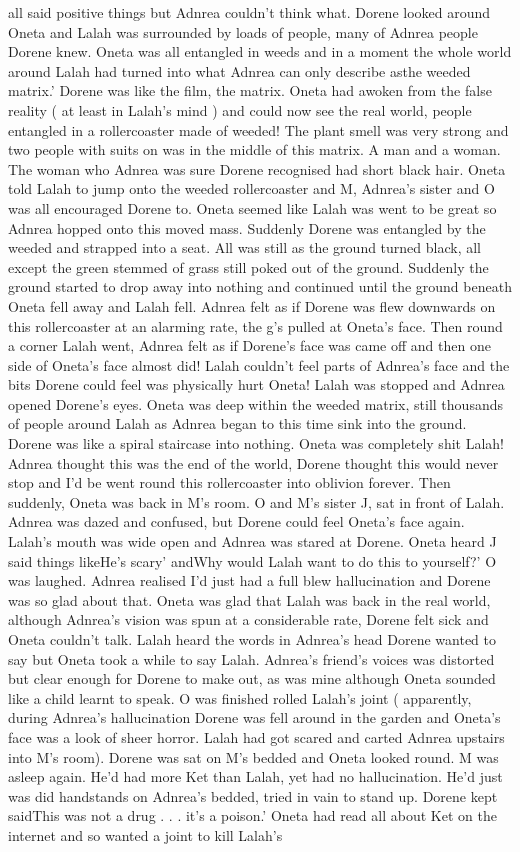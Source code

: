 \documentclass[12pt]{book}
\begin{document}
all said positive things but Adnrea couldn't think what. Dorene looked around Oneta and Lalah was surrounded by loads of people, many of Adnrea people Dorene knew. Oneta was all entangled in weeds and in a moment the whole world around Lalah had turned into what Adnrea can only describe asthe weeded matrix.' Dorene was like the film, the matrix. Oneta had awoken from the false reality ( at least in Lalah's mind ) and could now see the real world, people entangled in a rollercoaster made of weeded! The plant smell was very strong and two people with suits on was in the middle of this matrix. A man and a woman. The woman who Adnrea was sure Dorene recognised had short black hair. Oneta told Lalah to jump onto the weeded rollercoaster and M, Adnrea's sister and O was all encouraged Dorene to. Oneta seemed like Lalah was went to be great so Adnrea hopped onto this moved mass. Suddenly Dorene was entangled by the weeded and strapped into a seat. All was still as the ground turned black, all except the green stemmed of grass still poked out of the ground. Suddenly the ground started to drop away into nothing and continued until the ground beneath Oneta fell away and Lalah fell. Adnrea felt as if Dorene was flew downwards on this rollercoaster at an alarming rate, the g's pulled at Oneta's face. Then round a corner Lalah went, Adnrea felt as if Dorene's face was came off and then one side of Oneta's face almost did! Lalah couldn't feel parts of Adnrea's face and the bits Dorene could feel was physically hurt Oneta! Lalah was stopped and Adnrea opened Dorene's eyes. Oneta was deep within the weeded matrix, still thousands of people around Lalah as Adnrea began to this time sink into the ground. Dorene was like a spiral staircase into nothing. Oneta was completely shit Lalah! Adnrea thought this was the end of the world, Dorene thought this would never stop and I'd be went round this rollercoaster into oblivion forever. Then suddenly, Oneta was back in M's room. O and M's sister J, sat in front of Lalah. Adnrea was dazed and confused, but Dorene could feel Oneta's face again. Lalah's mouth was wide open and Adnrea was stared at Dorene. Oneta heard J said things likeHe's scary' andWhy would Lalah want to do this to yourself?' O was laughed. Adnrea realised I'd just had a full blew hallucination and Dorene was so glad about that. Oneta was glad that Lalah was back in the real world, although Adnrea's vision was spun at a considerable rate, Dorene felt sick and Oneta couldn't talk. Lalah heard the words in Adnrea's head Dorene wanted to say but Oneta took a while to say Lalah. Adnrea's friend's voices was distorted but clear enough for Dorene to make out, as was mine although Oneta sounded like a child learnt to speak. O was finished rolled Lalah's joint ( apparently, during Adnrea's hallucination Dorene was fell around in the garden and Oneta's face was a look of sheer horror. Lalah had got scared and carted Adnrea upstairs into M's room). Dorene was sat on M's bedded and Oneta looked round. M was asleep again. He'd had more Ket than Lalah, yet had no hallucination. He'd just was did handstands on Adnrea's bedded, tried in vain to stand up. Dorene kept saidThis was not a drug . . .  it's a poison.' Oneta had read all about Ket on the internet and so wanted a joint to kill Lalah's 
\end{document}
